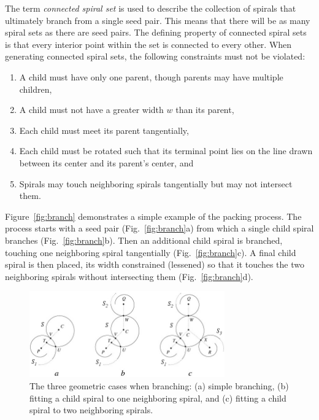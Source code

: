 \documentclass[11pt]{IEEEtran}
\begin{document}
The term \textit{connected spiral set} is used to describe the collection of spirals that ultimately branch from a single seed pair. This means that there will be as many spiral sets as there are seed pairs. The defining property of connected spiral sets is that every interior point within the set is connected to every other. When generating connected spiral sets, the following constraints must not be violated:
\begin{enumerate}
	\item A child must have only one parent, though parents may have multiple children,
	
	\item A child must not have a greater width $w$ than its parent,
  	
	\item Each child must meet its parent tangentially,
  	
	\item Each child must be rotated such that its terminal point lies on the line drawn between its center and its parent's center, and
  	
	\item Spirals may touch neighboring spirals tangentially but may not intersect them.
\end{enumerate}

Figure~\ref{fig:branch} demonstrates a simple example of the packing process. The process starts with a seed pair (Fig.~\ref{fig:branch}a) from which a single child spiral branches (Fig.~\ref{fig:branch}b). Then an additional child spiral is branched, touching one neighboring spiral tangentially (Fig.~\ref{fig:branch}c). A final child spiral is then placed, its width constrained (lessened) so that it touches the two neighboring spirals without intersecting them (Fig.~\ref{fig:branch}d).

\begin{figure}[t]
\centering \includegraphics[width=0.75\textwidth]{spiral-packing-fig-01}
\caption{The three geometric cases when branching: (a) simple branching, (b) fitting a child spiral to one neighboring spiral, and (c) fitting a child spiral to two neighboring spirals. \cite{Browne2006834}}
\label{fig:geo}
\end{figure}
\end{document}
